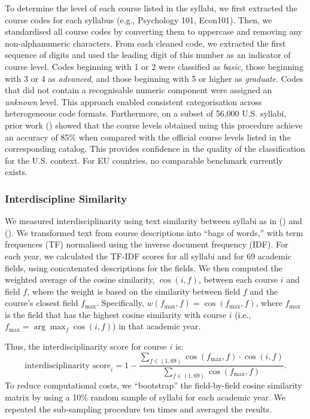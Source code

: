 \documentclass[
  11pt,
]{article}
\begin{document}
To determine the level of each course listed in the syllabi, we first extracted the course codes for each syllabus (e.g., Psychology 101, Econ101). Then, we standardised all course codes by converting them to uppercase and removing any non-alphanumeric characters. From each cleaned code, we extracted the first sequence of digits and used the leading digit of this number as an indicator of course level. Codes beginning with 1 or 2 were classified as \emph{basic}, those beginning with 3 or 4 as \emph{advanced}, and those beginning with 5 or higher as \emph{graduate}. Codes that did not contain a recognisable numeric component were assigned an \emph{unknown} level. This approach enabled consistent categorisation across heterogeneous code formats. Furthermore, on a subset of 56,000 U.S. syllabi, prior work () showed that the course levels obtained using this procedure achieve an accuracy of 85\% when compared with the official course levels listed in the corresponding catalog. This provides confidence in the quality of the classification for the U.S. context. For EU countries, no comparable benchmark currently exists.

\subsubsection{Interdiscipline Similarity}\label{si-interdisciplinarity}

We measured interdisciplinarity using text similarity between syllabi as in () and (). We transformed text from course descriptions into ``bags of words,'' with term frequences (TF) normalised using the inverse document frequency (IDF). For each year, we calculated the TF-IDF scores for all syllabi and for 69 academic fields, using concatenated descriptions for the fields. We then computed the weighted average of the cosine similarity, \(\cos (i, f)\), between each course \(i\) and field \(f\), where the weight is based on the similarity between field \(f\) and the course's closest field \(f_{\max}\). Specifically, \(w(f_{\max}, f) = \cos(f_{\max}, f)\), where \(f_{\max}\) is the field that has the highest cosine similarity with course \(i\) (i.e., \(f_{\max} = \arg\max_f \cos(i, f)\)) in that academic year.

Thus, the interdisciplinarity score for course \(i\) is:
\[
  \text{interdisciplinarity score}_i = 1 - \frac{\sum_{f \in (1, 69)} \cos(f_{\max}, f) \cdot \cos(i, f)}{\sum_{f \in (1, 69)} \cos(f_{\max}, f)}. 
\]
To reduce computational costs, we ``bootstrap'' the field-by-field cosine similarity matrix by using a 10\% random sample of syllabi for each academic year. We repeated the sub-sampling procedure ten times and averaged the results.
\end{document}
